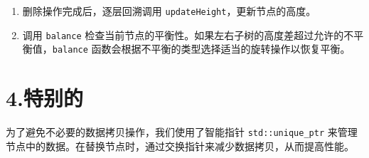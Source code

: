 \documentclass{article}
\begin{document}
\begin{enumerate}
    \item 删除操作完成后，逐层回溯调用 \texttt{updateHeight}，更新节点的高度。
    \item 调用 \texttt{balance} 检查当前节点的平衡性。如果左右子树的高度差超过允许的不平衡值，\texttt{balance} 函数会根据不平衡的类型选择适当的旋转操作以恢复平衡。
\end{enumerate}

\section*{4.特别的}
为了避免不必要的数据拷贝操作，我们使用了智能指针 \texttt{std::unique\_ptr} 来管理节点中的数据。在替换节点时，通过交换指针来减少数据拷贝，从而提高性能。
\end{document}
